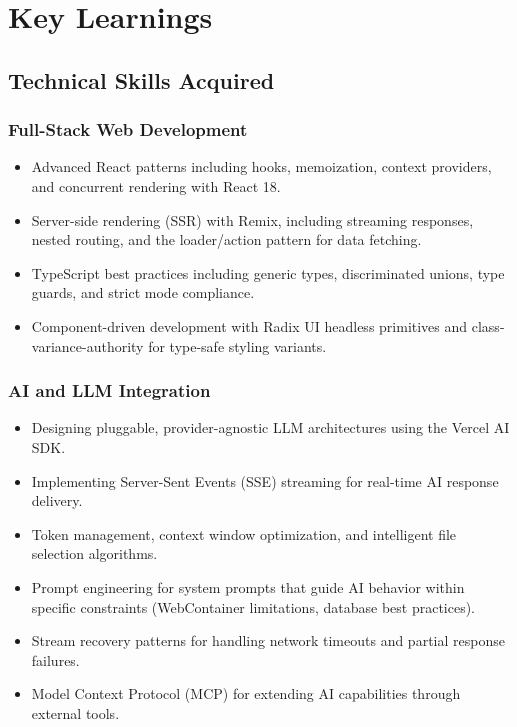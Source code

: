 \documentclass[12pt,a4paper,openany]{report}
\begin{document}
\section{Key Learnings}

\subsection{Technical Skills Acquired}

\subsubsection{Full-Stack Web Development}
\begin{itemize}
    \item Advanced React patterns including hooks, memoization, context providers, and concurrent rendering with React 18.
    \item Server-side rendering (SSR) with Remix, including streaming responses, nested routing, and the loader/action pattern for data fetching.
    \item TypeScript best practices including generic types, discriminated unions, type guards, and strict mode compliance.
    \item Component-driven development with Radix UI headless primitives and class-variance-authority for type-safe styling variants.
\end{itemize}

\subsubsection{AI and LLM Integration}
\begin{itemize}
    \item Designing pluggable, provider-agnostic LLM architectures using the Vercel AI SDK.
    \item Implementing Server-Sent Events (SSE) streaming for real-time AI response delivery.
    \item Token management, context window optimization, and intelligent file selection algorithms.
    \item Prompt engineering for system prompts that guide AI behavior within specific constraints (WebContainer limitations, database best practices).
    \item Stream recovery patterns for handling network timeouts and partial response failures.
    \item Model Context Protocol (MCP) for extending AI capabilities through external tools.
\end{itemize}
\end{document}
